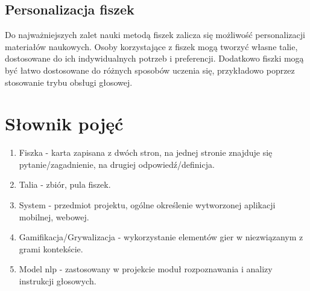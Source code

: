 \subsection{Personalizacja fiszek}

Do najważniejszych zalet nauki metodą fiszek zalicza się możliwość personalizacji materiałów naukowych. Osoby korzystające z fiszek mogą tworzyć własne talie, dostosowane do ich indywidualnych potrzeb i preferencji. Dodatkowo fiszki mogą być łatwo dostosowane do różnych sposobów uczenia się, przykładowo poprzez stosowanie trybu obsługi głosowej.

\section{Słownik pojęć}

\begin{enumerate}
    \item Fiszka - karta zapisana z dwóch stron, na jednej stronie znajduje się pytanie/zagadnienie, na drugiej odpowiedź/definicja.
    \item Talia - zbiór, pula fiszek.
    \item System - przedmiot projektu, ogólne określenie wytworzonej aplikacji mobilnej, webowej.
    \item Gamifikacja/Grywalizacja - wykorzystanie elementów gier w niezwiązanym z grami kontekście.\cite{gamificationWiki}
    \item Model nlp - zastosowany w projekcie moduł rozpoznawania i analizy instrukcji głosowych.
    \end{enumerate}
